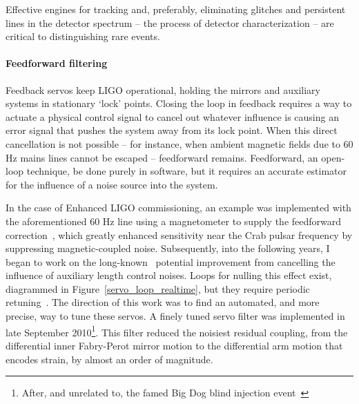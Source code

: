 Effective engines for tracking and, preferably, eliminating glitches and persistent lines in the detector spectrum -- the process of detector characterization -- are critical to distinguishing rare events.


                \paragraph{Feedforward filtering}
                \label{feedforward_filters}

Feedback servos keep LIGO operational, holding the mirrors and auxiliary systems in stationary `lock' points.
Closing the loop in feedback requires a way to actuate a physical control signal to cancel out whatever influence is causing an error signal that pushes the system away from its lock point.
When this direct cancellation is not possible -- for instance, when ambient magnetic fields due to 60 Hz mains lines cannot be escaped -- feedforward remains.
Feedforward, an open-loop technique, be done purely in software, but it requires an accurate estimator for the influence of a noise source into the system.

In the case of Enhanced LIGO commissioning, an example was implemented with the aforementioned 60 Hz line using a magnetometer to supply the feedforward correction~\cite{SmithThesis}, which greatly enhanced sensitivity near the Crab pulsar frequency by suppressing magnetic-coupled noise.
Subsequently, into the following years, I began to work on the long-known~\cite{AdhikariThesis,BallmerThesis} potential improvement from cancelling the influence of auxiliary length control noises.
Loops for nulling this effect exist, diagrammed in Figure~\ref{servo_loop_realtime}, but they require periodic retuning~\cite{KissellPRCMICH}.  
The direction of this work was to find an automated, and more precise, way to tune these servos.
A finely tuned servo filter was implemented in late September 2010\footnote{After, and unrelated to, the famed Big Dog blind injection event~\cite{Riles2013}}.
This filter reduced the noisiest residual coupling, from the differential inner Fabry-Perot mirror motion to the differential arm motion that encodes strain, by almost an order of magnitude. 

